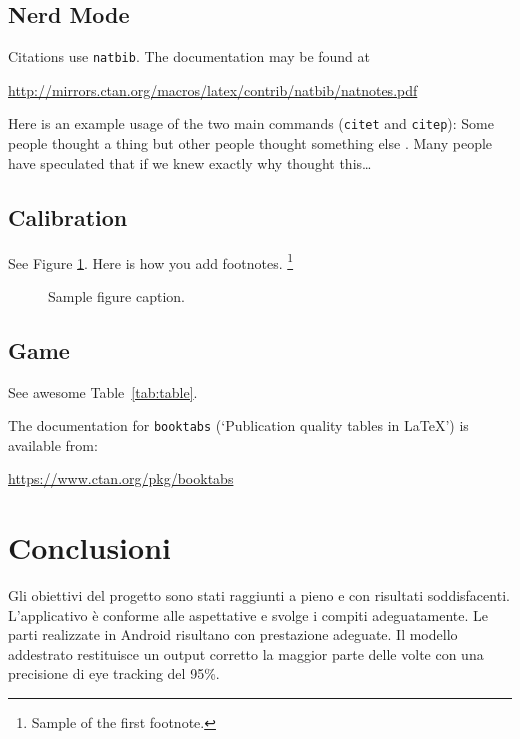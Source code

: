 \documentclass[11pt]{article}
\begin{document}
\subsection{Nerd Mode}
Citations use \verb+natbib+. The documentation may be found at
\begin{center}
	\url{http://mirrors.ctan.org/macros/latex/contrib/natbib/natnotes.pdf}
\end{center}

Here is an example usage of the two main commands (\verb+citet+ and \verb+citep+): Some people thought a thing \citep{kour2014real, hadash2018estimate} but other people thought something else \citep{kour2014fast}. Many people have speculated that if we knew exactly why \citet{kour2014fast} thought this\dots

\subsection{Calibration}
\lipsum[10]
See Figure \ref{fig:fig1}. Here is how you add footnotes. \footnote{Sample of the first footnote.}
\lipsum[11]

\begin{figure}
	\centering
	\fbox{\rule[-.5cm]{4cm}{4cm} \rule[-.5cm]{4cm}{0cm}}
	\caption{Sample figure caption.}
	\label{fig:fig1}
\end{figure}

\subsection{Game}
See awesome Table~\ref{tab:table}.

The documentation for \verb+booktabs+ (`Publication quality tables in LaTeX') is available from:
\begin{center}
	\url{https://www.ctan.org/pkg/booktabs}
\end{center}







\newpage
\section{Conclusioni}
Gli obiettivi del progetto sono stati raggiunti a pieno e con risultati soddisfacenti. 
\newline \newline
L’applicativo è
conforme alle aspettative e svolge i compiti adeguatamente.
Le parti realizzate
in Android risultano con prestazione adeguate.
\newline \newline
Il modello addestrato restituisce un output corretto la maggior parte delle volte con una precisione di eye tracking del 95\%.
\end{document}

